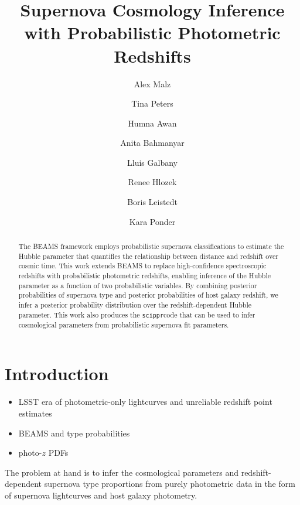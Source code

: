 \documentclass[12pt, onecolumn]{emulateapj}
\newcommand{\scippr}{\texttt{scippr}}
\begin{document}
\title{Supernova Cosmology Inference with Probabilistic Photometric Redshifts}

\author{Alex Malz}
\author{Tina Peters}
\author{Humna Awan}
\author{Anita Bahmanyar}
\author{Lluis Galbany}
\author{Renee Hlozek}
\author{Boris Leistedt}
\author{Kara Ponder}

\begin{abstract}
The BEAMS framework employs probabilistic supernova classifications to estimate the Hubble parameter that quantifies the relationship between distance and redshift over cosmic time.  This work extends BEAMS to replace high-confidence spectroscopic redshifts with probabilistic photometric redshifts, enabling inference of the Hubble parameter as a function of two probabilistic variables.  By combining posterior probabilities of supernova type and posterior probabilities of host galaxy redshift, we infer a posterior probability distribution over the redshift-dependent Hubble parameter.  This work also produces the \scippr code that can be used to infer cosmological parameters from probabilistic supernova fit parameters.
\end{abstract}

\keywords{}

\section{Introduction}
\label{sec:intro}

\citet{kunz_bayesian_2007, kelly_flexible_2008, hlozek_photometric_2012}

\begin{itemize}
	\item LSST era of photometric-only lightcurves and unreliable redshift point estimates
	\item BEAMS and type probabilities
	\item photo-$z$ PDFs
\end{itemize}

The problem at hand is to infer the cosmological parameters and redshift-dependent supernova type proportions from purely photometric data in the form of supernova lightcurves and host galaxy photometry.
\end{document}
